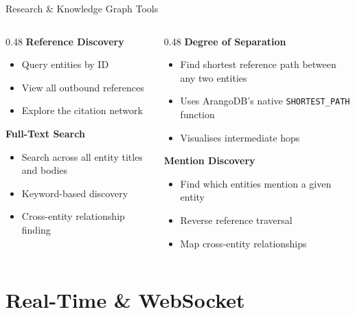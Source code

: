 \documentclass[aspectratio=169,11pt]{beamer}
\begin{document}
\begin{frame}{Research \& Knowledge Graph Tools}
  \begin{columns}[T]
    \begin{column}{0.48\textwidth}
      \textbf{Reference Discovery}
      \begin{itemize}
        \item Query entities by ID
        \item View all outbound references
        \item Explore the citation network
      \end{itemize}
      \vspace{0.5em}
      \textbf{Full-Text Search}
      \begin{itemize}
        \item Search across all entity titles and bodies
        \item Keyword-based discovery
        \item Cross-entity relationship finding
      \end{itemize}
    \end{column}
    \begin{column}{0.48\textwidth}
      \textbf{Degree of Separation}
      \begin{itemize}
        \item Find shortest reference path between any two entities
        \item Uses ArangoDB's native \texttt{SHORTEST\_PATH} function
        \item Visualises intermediate hops
      \end{itemize}
      \vspace{0.5em}
      \textbf{Mention Discovery}
      \begin{itemize}
        \item Find which entities mention a given entity
        \item Reverse reference traversal
        \item Map cross-entity relationships
      \end{itemize}
    \end{column}
  \end{columns}
\end{frame}

\section{Real-Time \& WebSocket}
\end{document}
